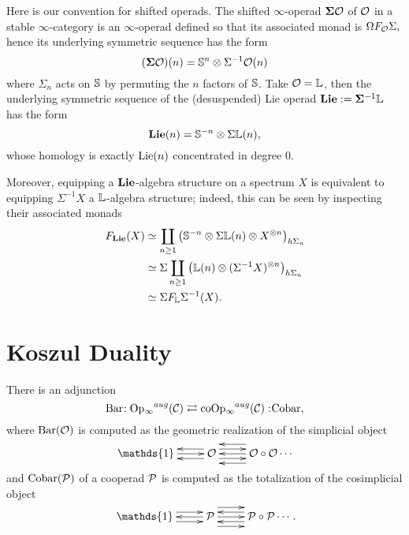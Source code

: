 \begin{remark}
\label{Remark on shifted Lie operads}
	Here is our convention for shifted operads.
	The shifted $\infty$-operad $\bf{\Sigma} {\mathcal{O}}$ of ${\mathcal{O}}$ in a stable $\infty$-category is an $\infty$-operad  defined so that its associated monad is
	$
	\Omega F_{{\mathcal{O}}}\Sigma,
	$
	hence its underlying symmetric sequence has the form
	$$
	(\mathbf{\Sigma} {\mathcal{O}} ) (n)= {\mathbb{S}}^{n}\otimes\Sigma^{-1} {\mathcal{O}}(n)
	$$
	where $\Sigma_n$ acts on ${\mathbb{S}}$ by permuting the $n$ factors of ${\mathbb{S}}$.
	Take ${\mathcal{O}}={\mathbb{L}}$, then
	the underlying symmetric sequence of the (desuspended) Lie operad $\mathbf{Lie}:= \mathbf{\Sigma}^{-1}{\mathbb{L}}$
	has the form 	
	$$
	\mathbf{Lie}(n)= {\mathbb{S}}^{-n} \otimes \Sigma {\mathbb{L}}(n),
	$$
	whose homology is exactly $\operatorname{Lie}(n)$ concentrated in degree $0$.
	
	Moreover, equipping a $\mathbf{Lie}$-algebra structure on a spectrum $X$ is equivalent to equipping $\Sigma^{-1} X$ a ${\mathbb{L}}$-algebra structure; indeed, this can be seen by inspecting their associated monads
	\begin{align*}
		F_{\mathbf{Lie}}(X) &\simeq \coprod_{n\geq 1}
		\big(
		{\mathbb{S}}^{-n} \otimes \Sigma{\mathbb{L}}(n) 
		\otimes X^{\otimes n}
		\big)_{h\Sigma_n}\\
		& \simeq 
		\Sigma
		\coprod_{n\geq 1}
		\big(
		{\mathbb{L}}(n) 
		\otimes (\Sigma^{-1} X)^{\otimes n}
		\big)_{h\Sigma_n}\\
		& \simeq 
		\Sigma F_{{\mathbb{L}}}\Sigma^{-1}(X).
	\end{align*}	
\end{remark}


\section{Koszul Duality}
\begin{proposition}
	There is an adjunction
	$$
	\operatorname{Bar}\negmedspace: \operatorname{Op_{\infty}}^{aug}({\mathcal{C}})\rightleftarrows \operatorname{coOp_{\infty}}^{aug}({\mathcal{C}}):\negmedspace \operatorname{Cobar},
	$$
	where $\operatorname{Bar}({\mathcal{O}})$ is computed as the geometric realization of the simplicial object
	\[
		\xymatrix{ \mathds{1}\ar@<0ex>[r]  &  
		\CO \ar@<1ex>[r] \ar@<-1ex>[r] \ar@<1ex>[l] \ar@<-1ex>[l]  &  \CO\circ \CO \ar@<2ex>[l] \ar@<0ex>[l] \ar@<-2ex>[l] \cdots}
\]
	and $\operatorname{Cobar}({\mathcal{P}})$ of a cooperad ${\mathcal{P}}$ is computed as the totalization of the cosimplicial object
	\[
		\xymatrix{ \mathds{1} \ar@<1ex>[r] \ar@<-1ex>[r] &  
		\CP \ar@<0ex>[l] \ar@<2ex>[r] \ar@<0ex>[r] \ar@<-2ex>[r] & \CP\circ \CP \ar@<1ex>[l] \ar@<-1ex>[l] \cdots}.
\]
\end{proposition}

